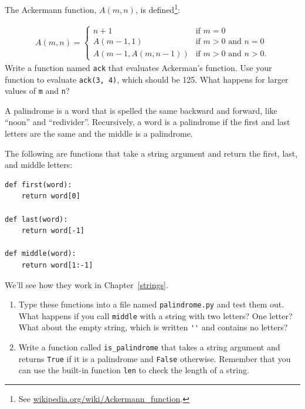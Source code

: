 \documentclass[10pt]{book}
\begin{document}
\begin{ex}

The Ackermann function, $A(m, n)$, is defined\footnote{See
  \url{wikipedia.org/wiki/Ackermann_function}.}:

\begin{eqnarray}
A(m, n) = \begin{cases} 
              n+1 & \mbox{if } m = 0 \\ 
        A(m-1, 1) & \mbox{if } m > 0 \mbox{ and } n = 0 \\ 
A(m-1, A(m, n-1)) & \mbox{if } m > 0 \mbox{ and } n > 0.
\end{cases} 
\end{eqnarray}
%
Write a function named {\tt ack} that evaluates Ackerman's function.
Use your function to evaluate {\tt ack(3, 4)}, which should be 125.
What happens for larger values of {\tt m} and {\tt n}?

\end{ex}


\begin{ex}
\label{palindrome}


A palindrome is a word that is spelled the same backward and
forward, like ``noon'' and ``redivider''.  Recursively, a word
is a palindrome if the first and last letters are the same
and the middle is a palindrome.

The following are functions that take a string argument and
return the first, last, and middle letters:

\beforeverb
\begin{verbatim}
def first(word):
    return word[0]

def last(word):
    return word[-1]

def middle(word):
    return word[1:-1]
\end{verbatim}
\afterverb
%
We'll see how they work in Chapter~\ref{strings}.

\begin{enumerate}

\item Type these functions into a file named {\tt palindrome.py}
and test them out.  What happens if you call {\tt middle} with
a string with two letters?  One letter?  What about the empty
string, which is written \verb"''" and contains no letters?

\item Write a function called \verb"is_palindrome" that takes
a string argument and returns {\tt True} if it is a palindrome
and {\tt False} otherwise.  Remember that you can use the
built-in function {\tt len} to check the length of a string.

\end{enumerate}

\end{ex}
\end{document}
